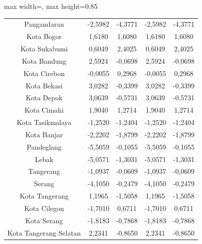 \begin{table}[H]
\begin{adjustbox}{max width=\textwidth, max height=0.85\textheight}
\begin{tabular}{|c|c|c|c|c|}
Pangandaran & -2,5982 & -4,3771 & -2,5982 & -4,3771 \\
Kota Bogor & 1,6180 & 1,6080 & 1,6180 & 1,6080 \\
Kota Sukabumi & 0,6049 & 2,4025 & 0,6049 & 2,4025 \\
Kota Bandung & 2,5924 & -0,0698 & 2,5924 & -0,0698 \\
Kota Cirebon & -0,0055 & 0,2968 & -0,0055 & 0,2968 \\
Kota Bekasi & 3,0282 & -0,3399 & 3,0282 & -0,3399 \\
Kota Depok & 3,0639 & -0,5731 & 3,0639 & -0,5731 \\
Kota Cimahi & 1,9040 & 1,2714 & 1,9040 & 1,2714 \\
Kota Tasikmalaya & -1,2520 & -1,2404 & -1,2520 & -1,2404 \\
Kota Banjar & -2,2202 & -1,8799 & -2,2202 & -1,8799 \\
Pandeglang & -5,5059 & -0,1055 & -5,5059 & -0,1055 \\
Lebak & -5,0571 & -1,3031 & -5,0571 & -1,3031 \\
Tangerang & -1,0937 & -0,0609 & -1,0937 & -0,0609 \\
Serang & -4,1050 & -0,2479 & -4,1050 & -0,2479 \\
Kota Tangerang & 1,1965 & -1,5058 & 1,1965 & -1,5058 \\
Kota Cilegon & -1,7010 & 0,6711 & -1,7010 & 0,6711 \\
Kota Serang & -1,8183 & -0,7868 & -1,8183 & -0,7868 \\
Kota Tangerang Selatan & 2,2341 & -0,8650 & 2,2341 & -0,8650 \\
\hline
\end{tabular}
\end{adjustbox}
\end{table}